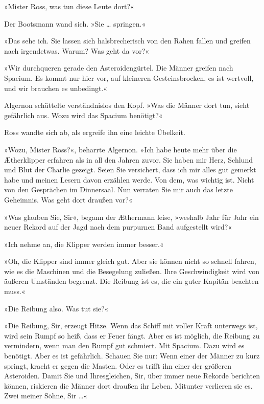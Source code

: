»Mister Ross, was tun diese Leute dort?«

Der Bootsmann wand sich. »Sie \ldots{} springen.«

»Das sehe ich. Sie lassen sich halsbrecherisch von den Rahen fallen
und greifen nach irgendetwas. Warum? Was geht da vor?«

»Wir durchqueren gerade den Asteroidengürtel. Die Männer greifen
nach Spacium. Es kommt nur hier vor, auf kleineren Gesteinsbrocken,
es ist wertvoll, und wir brauchen es unbedingt.«

Algernon schüttelte verständnislos den Kopf. »Was die Männer dort
tun, sieht gefährlich aus. Wozu wird das Spacium benötigt?«

\bigpar

Ross wandte sich ab, als ergreife ihn eine leichte Übelkeit.

»Wozu, Mister Ross?«, beharrte Algernon. »Ich habe heute mehr über
die Ætherklipper erfahren als in all den Jahren zuvor. Sie haben
mir Herz, Schlund und Blut der Charlie gezeigt. Seien Sie
versichert, dass ich mir alles gut gemerkt habe und meinen Lesern
davon erzählen werde. Von dem, was wichtig ist. Nicht von den
Gesprächen im Dinnersaal. Nun verraten Sie mir auch das letzte
Geheimnis. Was geht dort draußen vor?«

»Was glauben Sie, Sir«, begann der Æthermann leise, »weshalb Jahr
für Jahr ein neuer Rekord auf der Jagd nach dem purpurnen Band
aufgestellt wird?«

»Ich nehme an, die Klipper werden immer besser.«

»Oh, die Klipper sind immer gleich gut. Aber sie können nicht so
schnell fahren, wie es die Maschinen und die Besegelung zuließen.
Ihre Geschwindigkeit wird von äußeren Umständen begrenzt. Die
Reibung ist es, die ein guter Kapitän beachten muss.«

»Die Reibung also. Was tut sie?«

»Die Reibung, Sir, erzeugt Hitze. Wenn das Schiff mit voller Kraft
unterwegs ist, wird sein Rumpf so heiß, dass er Feuer fängt. Aber
es ist möglich, die Reibung zu vermindern, wenn man den Rumpf gut
schmiert. Mit Spacium. Dazu wird es benötigt. Aber es ist
gefährlich. Schauen Sie nur: Wenn einer der Männer zu kurz springt,
kracht er gegen die Masten. Oder es trifft ihn einer der größeren
Asteroiden. Damit Sie und Ihresgleichen, Sir, über immer neue
Rekorde berichten können, riskieren die Männer dort draußen ihr
Leben. Mitunter verlieren sie es. Zwei meiner Söhne, Sir \ldots{}«

